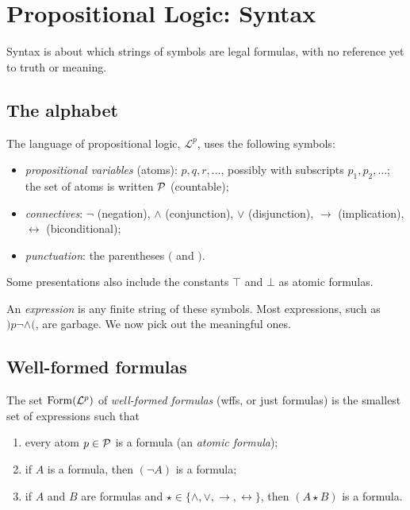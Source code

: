 \chapter{Propositional Logic: Syntax}\label{ch:propsyntax}

Syntax is about which strings of symbols are legal formulas, with no reference yet to
truth or meaning.

\section{The alphabet}

The language of propositional logic, $\mathcal{L}^p$, uses the following symbols:
\begin{itemize}
  \item \emph{propositional variables} (atoms): $p, q, r, \dots$, possibly with
        subscripts $p_1, p_2, \dots$; the set of atoms is written $\mathcal{P}$ (countable);
  \item \emph{connectives}: $\neg$ (negation), $\land$ (conjunction), $\lor$ (disjunction),
        $\to$ (implication), $\leftrightarrow$ (biconditional);
  \item \emph{punctuation}: the parentheses $($ and $)$.
\end{itemize}
Some presentations also include the constants $\top$ and $\bot$ as atomic formulas.

An \emph{expression} is any finite string of these symbols. Most expressions, such as
$)p\neg\land($, are garbage. We now pick out the meaningful ones.

\section{Well-formed formulas}

\begin{definition}
The set $\mathrm{Form}(\mathcal{L}^p)$ of \emph{well-formed formulas} (wffs, or just formulas) is
the smallest set of expressions such that
\begin{enumerate}
  \item every atom $p \in \mathcal{P}$ is a formula (an \emph{atomic formula});
  \item if $A$ is a formula, then $(\neg A)$ is a formula;
  \item if $A$ and $B$ are formulas and $\star \in \{\land,\lor,\to,\leftrightarrow\}$,
        then $(A \star B)$ is a formula.
\end{enumerate}
\end{definition}

